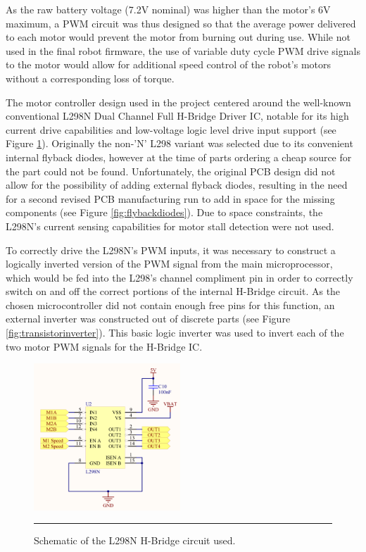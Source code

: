 As the raw battery voltage (7.2V nominal) was higher than the motor's 6V maximum, a PWM circuit was thus designed so that the average power delivered to each motor would prevent the motor from burning out during use. While not used in the final robot firmware, the use of variable duty cycle PWM drive signals to the motor would allow for additional speed control of the robot's motors without a corresponding loss of torque.

The motor controller design used in the project centered around the well-known conventional L298N Dual Channel Full H-Bridge Driver IC, notable for its high current drive capabilities and low-voltage logic level drive input support (see Figure \ref{fig:hbridge}). Originally the non-'N' L298 variant was selected due to its convenient internal flyback diodes, however at the time of parts ordering a cheap source for the part could not be found. Unfortunately, the original PCB design did not allow for the possibility of adding external flyback diodes, resulting in the need for a second revised PCB manufacturing run to add in space for the missing components (see Figure \ref{fig:flybackdiodes}). Due to space constraints, the L298N's current sensing capabilities for motor stall detection were not used.

To correctly drive the L298N's PWM inputs, it was necessary to construct a logically inverted version of the PWM signal from the main microprocessor, which would be fed into the L298's channel compliment pin in order to correctly switch on and off the correct portions of the internal H-Bridge circuit. As the chosen microcontroller did not contain enough free pins for this function, an external inverter was constructed out of discrete parts (see Figure \ref{fig:transistorinverter}). This basic logic inverter was used to invert each of the two motor PWM signals for the H-Bridge IC.

\begin{figure}[tbph]
	\centering
		\includegraphics[width=55mm]{./Figures/PWMDriver.png}
	\rule{35em}{0.5pt}
	\caption[Motor H-Bridge Schematic]{Schematic of the L298N H-Bridge circuit used.}
	\label{fig:hbridge}
\end{figure}

